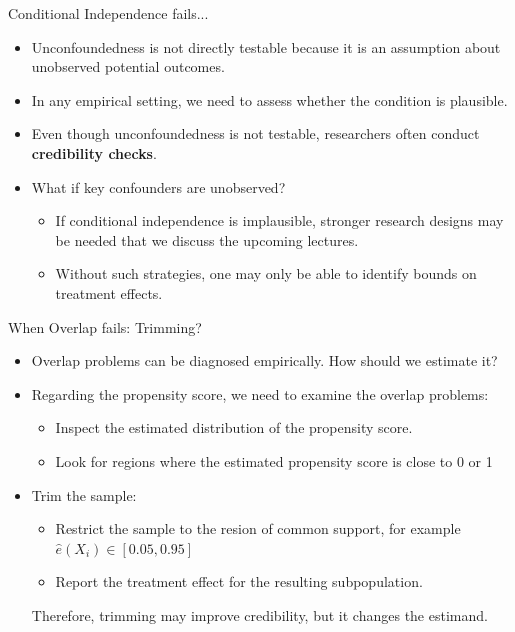 \documentclass[11pt,aspectratio=169]{beamer}
\begin{document}
\begin{frame}{Conditional Independence fails...}
\begin{itemize}
  \item Unconfoundedness is not directly testable because it is an assumption about unobserved potential outcomes.
  \item In any empirical setting, we need to assess whether the condition is plausible.
  \item Even though unconfoundedness is not testable, researchers often conduct \textbf{credibility checks}.
  \item What if key confounders are unobserved?
  \begin{itemize}
    \item If conditional independence is implausible, stronger research designs may be needed that we discuss the upcoming lectures.
    \item Without such strategies, one may only be able to identify bounds on treatment effects.
  \end{itemize}
\end{itemize}

\end{frame}


\begin{frame}
\end{frame}


\begin{frame}
\end{frame}





\begin{frame}{When Overlap fails: Trimming?}
\begin{itemize}
  \item Overlap problems can be diagnosed empirically. How should we estimate it?
  \item Regarding the propensity score, we need to examine the overlap problems:
  \begin{itemize}
    \item Inspect the estimated distribution of the propensity score.
    \item Look for regions where the estimated propensity score is close to 0 or 1
  \end{itemize}
  \item Trim the sample:
  \begin{itemize}
    \item Restrict the sample to the resion of common support, for example $\hat{e}(X_i)\in [0.05,0.95]$
    \item Report the treatment effect for the resulting subpopulation.
  \end{itemize}
  Therefore, trimming may improve credibility, but it changes the estimand.
\end{itemize}

\end{frame}
\end{document}

